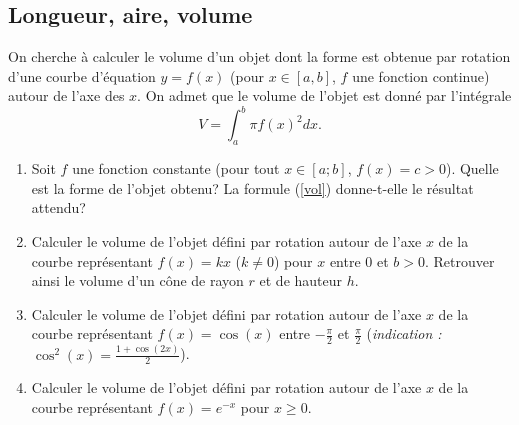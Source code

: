 \subsection{Longueur, aire, volume}


\begin{exo}

    On cherche à calculer le volume d'un objet dont la forme est obtenue par rotation d'une courbe d'équation $y=f(x)$ (pour $x \in [a,b]$, $f$ une fonction continue)
    autour de l'axe des $x$. On admet que le volume de l'objet est donné par l'intégrale
    \begin{equation}
        V=\int_{a}^{b} \pi f(x)^{2}dx. \label{vol}
    \end{equation}
    \vspace{-3mm}

    \begin{enumerate}
        \item Soit $f$ une fonction constante (pour tout $x\in[a;b]$, $f(x)=c>0$). Quelle est la forme de l'objet obtenu? La formule (\ref{vol}) donne-t-elle le résultat attendu?
        \item Calculer le volume de l'objet défini par rotation autour de l'axe $x$ de la courbe représentant $f(x)= kx$ ($k\not= 0$) pour $x$ entre $0$ et $b>0$. Retrouver ainsi le volume d'un cône de rayon $r$ et de hauteur $h$.
        \item Calculer le volume de l'objet défini par rotation autour de l'axe $x$ de la courbe représentant $f(x)= \cos (x)$ entre $- \frac \pi 2$ et $\frac \pi 2$ (\textit{indication : $\cos^{2}(x)=\frac{1+\cos(2x)}{2}$}).
        \item Calculer le volume de l'objet défini par rotation autour de l'axe $x$ de la courbe représentant $f(x)=e^{-x}$ pour $x\ge0$.
    \end{enumerate}
\end{exo}

